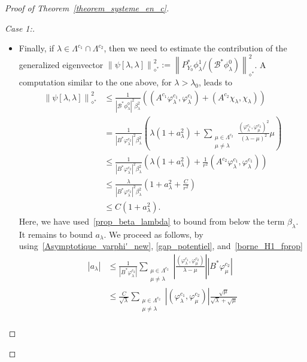 \documentclass[11pt]{article}
\theoremstyle{definition}
\numberwithin{equation}{section}
\numberwithin{figure}{section}
\numberwithin{table}{section}
\newenvironment{step}[1]{\begin{proof}[#1]}{\let\qed\relax\end{proof}}
\newcommand{\fprop}[2]{\varphi^{#1}_{#2}}
\newcommand\Bs{\mathcal{B}^*}
\newcommand{\Fzp}{Y_0}
\newcommand{\normeXalphas}[1]{\left\| #1 \right\|_{\diamond^*}}
\newcommand{\PFa}{P_{\Fzp}^*}
\begin{document}
\begin{proof}[Proof of Theorem~\ref{theorem_systeme_en_c}]
\begin{step}{Case 1:}
\begin{itemize}
Using Parseval's identity, \eqref{borne_H1_fprop} and then~\eqref{ABM_xi_lambda}, we finally obtain
\begin{align*}
\normeXalphas{\psi[\lambda]}^2 & \leq \frac{1}{|B^* \xi_\lambda|^2} \left(\lambda + \frac{1}{r^2} (\fprop{c_1}{\lambda}, A^{c_2}\fprop{c_1}{\lambda}) \right) \\
& \leq \frac{\lambda}{|B^* \xi_\lambda|^2} \left(1 + \frac{C}{r^2}\right)\\
& \leq C.
\end{align*}

\item Finally, if $\lambda\in \Lambda^{c_1}\cap \Lambda^{c_2}$, then we need to estimate the contribution of the generalized eigenvector $\normeXalphas{\psi[\lambda,\lambda]}^2:=\normeXalphas{\PFa \phi_\lambda^1/(\Bs \phi_\lambda^0)}^2$. A computation similar to the one above, for $\lambda > \lambda_0$, leads to
\begin{align*}
\normeXalphas{\psi[\lambda,\lambda]}^2& \leq \frac{1}{|\Bs \phi_\lambda^0|^2 \beta_\lambda^2} \left((A^{c_1} \fprop{c_1}{\lambda},\fprop{c_1}{\lambda}) + (A^{c_2} \chi_\lambda,\chi_\lambda) \right) \\
& = \frac{1}{|B^* \fprop{c_2}{\lambda}|^2 \beta_\lambda^2} \left(\lambda (1+a_\lambda^2) + \sum_{\substack{\mu \in \Lambda^{c_2}\\ \mu\neq \lambda}} \frac{(\fprop{c_1}{\lambda},\fprop{c_2}{\mu})^2}{(\lambda-\mu)^2} \mu \right)\\
& \leq \frac{1}{|B^* \fprop{c_2}{\lambda}|^2 \beta_\lambda^2} \left(\lambda (1+a_\lambda^2) + \frac{1}{r^2} (A^{c_2}\fprop{c_1}{\lambda},\fprop{c_1}{\lambda}) \right)\\
& \leq \frac{\lambda}{|B^* \fprop{c_2}{\lambda}|^2 \beta_\lambda^2} \left(1+a_\lambda^2 + \frac{C}{r^2} \right)\\
& \leq C (1+a_\lambda^2).
\end{align*}
Here, we have used~\eqref{prop_beta_lambda} to bound from below the term $\beta_\lambda$. It remains to bound $a_\lambda$. We proceed as follows, by using~\eqref{Asymptotique_varphi'_new}, \eqref{gap_potentiel}, and~\eqref{borne_H1_fprop}
\begin{align*}
|a_\lambda| & \leq \frac{1}{|B^* \fprop{c_2}{\lambda}|} \sum_{\substack{\mu\in \Lambda^{c_2}\\ \mu \neq \lambda}} \left| \frac{(\fprop{c_1}{\lambda},\fprop{c_2}{\mu})}{\lambda-\mu}\right| |B^* \fprop{c_2}{\mu}| \\
& \leq \frac{C}{\sqrt{\lambda}} \sum_{\substack{\mu\in \Lambda^{c_2}\\ \mu \neq \lambda}} |(\fprop{c_1}{\lambda},\fprop{c_2}{\mu})| \frac{\sqrt{\mu}}{\sqrt{\lambda}+\sqrt{\mu}} \\

\end{align*}
\end{itemize}
\end{step}
\end{proof}
\end{document}

